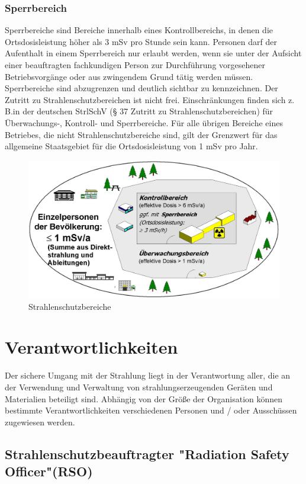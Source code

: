 {\subsubsection{Sperrbereich}
Sperrbereiche sind Bereiche innerhalb eines Kontrollbereichs, in denen die Ortsdosisleistung höher als 3 mSv pro Stunde sein kann. Personen darf der Aufenthalt in einem Sperrbereich nur erlaubt werden, wenn sie unter der Aufsicht einer beauftragten fachkundigen Person zur Durchführung vorgesehener Betriebsvorgänge oder aus zwingendem Grund tätig werden müssen. Sperrbereiche sind abzugrenzen und deutlich sichtbar zu kennzeichnen.
Der Zutritt zu Strahlenschutzbereichen ist nicht frei. Einschränkungen finden sich z. B.in der deutschen StrlSchV (§ 37 Zutritt zu Strahlenschutzbereichen) für Überwachungs-, Kontroll- und Sperrbereiche.
Für alle übrigen Bereiche eines Betriebes, die nicht Strahlenschutzbereiche sind, gilt der Grenzwert für das allgemeine Staatsgebiet für die Ortsdosisleistung von 1 mSv pro Jahr.
\begin{figure}[htb]

  \includegraphics[scale=0.4]{img/Strahlenschutzbereiche.jpg}
  \caption{Strahlenschutzbereiche}
  \label{fig:Strahlenschutzbereiche}
\end{figure}


\section{Verantwortlichkeiten}
Der sichere Umgang mit der Strahlung liegt in der Verantwortung aller, die an der Verwendung und Verwaltung von strahlungserzeugenden Geräten und Materialien beteiligt sind. Abhängig von der Größe der Organisation können bestimmte Verantwortlichkeiten verschiedenen Personen und / oder Ausschüssen zugewiesen werden.
\subsection{Strahlenschutzbeauftragter "Radiation Safety Officer"(RSO)}

}
